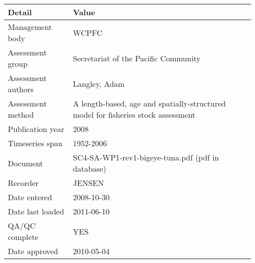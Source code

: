 \begin{table}[htb]
\centering
\begin{tabular}{lp{7cm}}
\toprule
Detail & Value \\
\midrule
Management body    & WCPFC                                                                             \\
Assessment group   & Secretariat of the Pacific Community                                              \\
Assessment authors & Langley, Adam                                                                     \\
Assessment method  & A length-based, age and spatially-structured model for fisheries stock assessment \\
Publication year   & 2008                                                                              \\
Timeseries span    & 1952-2006                                                                         \\
Document           & SC4-SA-WP1-rev1-bigeye-tuna.pdf (pdf in database)                                 \\
Recorder           & JENSEN                                                                            \\
Date entered       & 2008-10-30                                                                        \\
Date last loaded   & 2011-06-10                                                                        \\
QA/QC complete     & YES                                                                               \\
Date approved      & 2010-05-04                                                                        \\
\bottomrule
\end{tabular}
\label{tab:assessdet}
\end{table}
